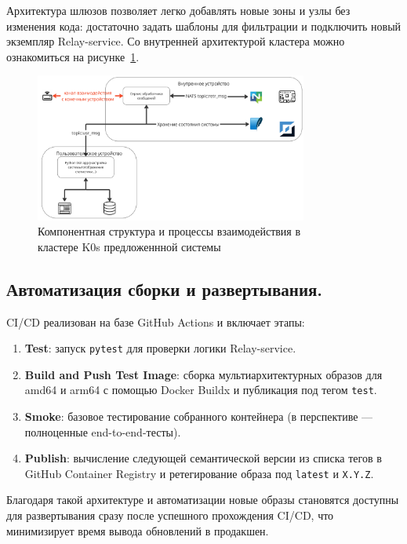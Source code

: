 \documentclass[14pt, a4paper]{extreport}
\begin{document}
Архитектура шлюзов позволяет легко добавлять новые зоны и узлы без изменения кода: достаточно задать шаблоны для фильтрации и подключить новый экземпляр Relay-service. Со внутренней архитектурой кластера можно ознакомиться на рисунке~\ref{fig:InternalSystemDesign}.

\begin{figure}[ht]
    \centering
    \includegraphics[width=0.8\textwidth]{images/InternalSystemDesign.png}
    \captionsetup{justification=centering}
    \caption{Компонентная структура и процессы взаимодействия в\\кластере K0s предложеннной системы}
    \label{fig:InternalSystemDesign}
\end{figure}

\subsection{Автоматизация сборки и развертывания.}

CI/CD реализован на базе GitHub Actions и включает этапы:

\begin{enumerate}
  \item \textbf{Test}: запуск \texttt{pytest} для проверки логики Relay-service.
  \item \textbf{Build and Push Test Image}: сборка мультиархитектурных образов для amd64 и arm64 с помощью Docker Buildx и публикация под тегом \texttt{test}.
  \item \textbf{Smoke}: базовое тестирование собранного контейнера (в перспективе — полноценные end-to-end-тесты).
  \item \textbf{Publish}: вычисление следующей семантической версии из списка тегов в GitHub Container Registry и ретегирование образа под \texttt{latest} и \texttt{X.Y.Z}.
\end{enumerate}

Благодаря такой архитектуре и автоматизации новые образы становятся доступны для развертывания сразу после успешного прохождения CI/CD, что минимизирует время вывода обновлений в продакшен.
\end{document}
